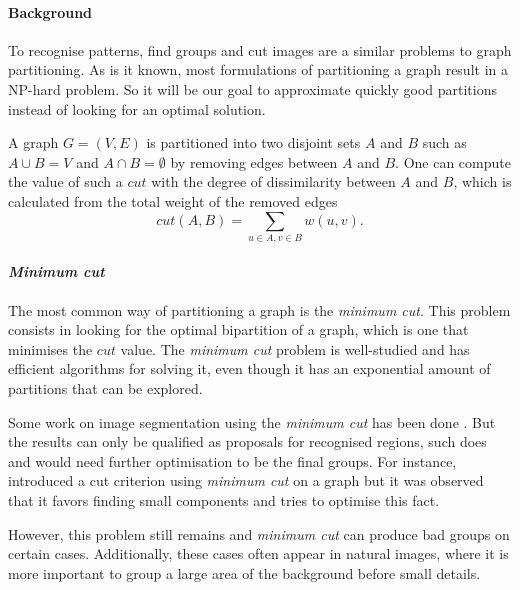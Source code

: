 \documentclass[]{article}
\begin{document}
\paragraph{Background}
To recognise patterns, find groups and cut images are a similar problems to graph partitioning.
As is it known, most formulations of partitioning a graph result in a NP-hard problem.
So it will be our goal to approximate quickly good partitions instead of looking for an optimal solution.

A graph \(G = (V, E)\) is partitioned into two disjoint sets \(A\) and \(B\) such as \(A \cup B = V\) and \(A \cap B = \emptyset\) by removing edges between \(A\) and \(B\).
One can compute the value of such a \(cut\) with the degree of dissimilarity between \(A\) and \(B\), which is calculated from the total weight of the removed edges
\[cut(A, B) = \sum_{u\in A, v\in B} w(u, v).\]

\paragraph{\textit{Minimum cut}}
The most common way of partitioning a graph is the \textit{minimum cut}.
This problem consists in looking for the optimal bipartition of a graph, which is one that minimises the \(cut\) value.
The \textit{minimum cut} problem is well-studied and has efficient algorithms for solving it, even though it has an exponential amount of partitions that can be explored.

Some work on image segmentation using the \textit{minimum cut} has been done \cite{wu_optimal_1993} \cite{estrada_spectral_2004} \cite{felzenszwalb_efficient_2004}.
But the results can only be qualified as proposals for recognised regions, such does \cite{estrada_spectral_2004} and would need further optimisation to be the final groups.
For instance, \cite{wu_optimal_1993} introduced a cut criterion using \textit{minimum cut} on a graph but it was observed that it favors finding small components and \cite{felzenszwalb_efficient_2004} tries to optimise this fact.

However, this problem still remains and \textit{minimum cut} can produce bad groups on certain cases.
Additionally, these cases often appear in natural images, where it is more important to group a large area of the background before small details.
\end{document}
